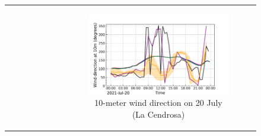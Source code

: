 \begin{figure}[hbtp]
\begin{tabular}{cc}
\begin{subfigure}[t]{0.5\textwidth}
        \end{subfigure} &
        \begin{subfigure}[t]{0.5\textwidth}
            \caption{10-meter wind direction on 20 July (La Cendrosa)}
            \includegraphics[width=\textwidth]{images/chap5/IOP_TS/TS_2021-07-20_cendrosa_wind_direction_10m.png}
        \end{subfigure} \\
    \end{tabular}
    \caption{}
    \label{fig:iop_days_TS_surfvars}
\end{figure}

